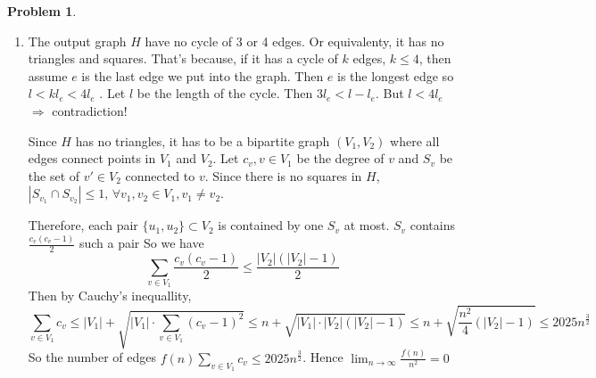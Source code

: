 \documentclass[a4paper]{article}
\theoremstyle{definition}
\newtheorem{problem}{Problem}
\theoremstyle{plain}
\newcommand{\dps}{\displaystyle}
\numberwithin{equation}{problem}
\begin{document}
\begin{problem}
\begin{enumerate}[label=(\alph*)]
\begin{proof}
      Finally, we prove that apply Kruskal's Algorithm to the changed graph produces a same valid execution of Kruskal's Algorithm on the original $ G $.

      That's because, the change will not change the ordinal relationship between edges with distinct cost. So the effect of the change on the order is only to rearrange the edges with the same weight. So the effect of the change on the order is only to rearrange the edges with the same weight. Equivalently, the order of edges in Kruskal's Algorithm on the changed graph is still a valid order in Kruskal's Algorithm on  the original graph. Since Kruskal's Algorithm returns the same result if the order and the edges are determined, they produces the same MST,  $ T $. 
    \end{proof}

    \item The output graph  $ H $ have no cycle of 3 or 4 edges. Or equivalenty, it has no triangles and squares. That's because, 
    if it has a cycle of  $ k $ edges,  $ k \leq 4 $, then assume  $ e  $ is the last edge we put into the graph. Then  $ e $ is the longest edge so  $ l<kl_e<4l_e $ .  Let  $ l $ be the length of the cycle. Then     $ 3l_e <l-l_e  $. But  $ l<4l_e $ $ \Rightarrow  $ contradiction!

    Since  $ H $  has no triangles, it has to be a bipartite graph $ (V_1,V_2) $ where all edges connect points in  $ V_1 $ and  $ V_2 $. Let  $ c_v,v\in V_1 $ be the degree of  $ v $ and  $ S_v $ be the set of  $ v'\in V_2 $  connected to  $ v $. Since there is no squares in  $ H $,  $ |S_{v_1}\cap S_{v_2}| \leq 1,\,\forall v_1,v_2\in V_1,v_1\neq v_2 $.
    
    Therefore, each pair  $ \{u_1,u_2\}\subset V_2 $ is contained by one  $ S_v $ at most. $ S_v $ contains  $ \dps\frac{c_v(c_v-1)}{2} $ such a pair   So we have 
    \[\sum_{v\in V_1}\frac{c_v(c_v-1)}{2} \leq \frac{|V_2|(|V_2|-1)}{2}\]
    Then by Cauchy's inequallity, 
    \[\sum_{v\in V_1}c_v \leq |V_1|+\sqrt{|V_1|\cdot\sum_{v\in V_1}(c_v-1)^2} \leq n+\sqrt{|V_1|\cdot |V_2|(|V_2|-1)} \leq n+\sqrt{\frac{n^2}{4}(|V_2|-1)} \leq 2025n^{\frac{3}{2}} \]
    So the number of edges  $ f(n) \dps\sum_{v\in V_1}c_v \leq 2025n^{\frac{3}{2}} $. Hence  $ \dps\lim_{n\to\infty}\frac{f(n)}{n^2}=0 $   
  \end{enumerate}
\end{problem}
\end{document}

